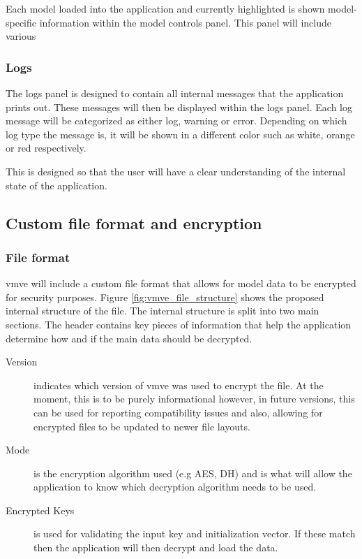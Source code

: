 \documentclass[11pt]{article}
\begin{document}
Each model loaded into the application and currently highlighted is shown
model-specific information within the model controls panel. This panel will include various 


\subsubsection{Logs}
The logs panel is designed to contain all internal messages that the application
prints out. These messages will then be displayed within the logs panel. Each
log message will be categorized as either log, warning or error. Depending on
which log type the message is, it will be shown in a different color such as
white, orange or red respectively.

This is designed so that the user will have a clear understanding of the internal state
of the application.

\subsection{Custom file format and encryption}

\subsubsection{File format}
\gls*{vmve} will include a custom file format that allows for model data to be
encrypted for security purposes. Figure \ref{fig:vmve_file_structure} shows the
proposed internal structure of the file. The internal structure is split into
two main sections. The header contains key pieces of information that help the
application determine how and if the main data should be decrypted.

\begin{description}
  \item[Version] indicates which version of \gls*{vmve} was used to encrypt the
  file. At the moment, this is to be purely informational however, in future
  versions, this can be used for reporting compatibility issues and also,
  allowing for encrypted files to be updated to newer file layouts.
  \item[Mode] is the encryption algorithm used (e.g AES, DH) and is what will
  allow the application to know which decryption algorithm needs to be used.
  \item[Encrypted Keys] is used for validating the input key and initialization
  vector. If these match then the application will then decrypt and load the data.
\end{description}
\end{document}

